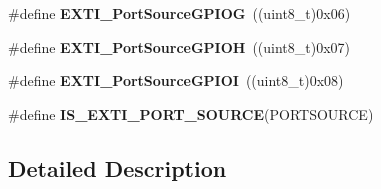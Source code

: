 \begin{DoxyCompactItemize}
\item 
\hypertarget{group___s_y_s_c_f_g___e_x_t_i___port___sources_gab21c24889233b24373a471222e85b950}{\#define {\bfseries E\-X\-T\-I\-\_\-\-Port\-Source\-G\-P\-I\-O\-G}~((uint8\-\_\-t)0x06)}\label{group___s_y_s_c_f_g___e_x_t_i___port___sources_gab21c24889233b24373a471222e85b950}

\item 
\hypertarget{group___s_y_s_c_f_g___e_x_t_i___port___sources_gaf7fb8bbfc4d796b92df64e41a2c44dc6}{\#define {\bfseries E\-X\-T\-I\-\_\-\-Port\-Source\-G\-P\-I\-O\-H}~((uint8\-\_\-t)0x07)}\label{group___s_y_s_c_f_g___e_x_t_i___port___sources_gaf7fb8bbfc4d796b92df64e41a2c44dc6}

\item 
\hypertarget{group___s_y_s_c_f_g___e_x_t_i___port___sources_ga9f57956fd533afa9b5d323601842c74e}{\#define {\bfseries E\-X\-T\-I\-\_\-\-Port\-Source\-G\-P\-I\-O\-I}~((uint8\-\_\-t)0x08)}\label{group___s_y_s_c_f_g___e_x_t_i___port___sources_ga9f57956fd533afa9b5d323601842c74e}

\item 
\#define {\bfseries I\-S\-\_\-\-E\-X\-T\-I\-\_\-\-P\-O\-R\-T\-\_\-\-S\-O\-U\-R\-C\-E}(P\-O\-R\-T\-S\-O\-U\-R\-C\-E)
\end{DoxyCompactItemize}


\subsection{Detailed Description}


